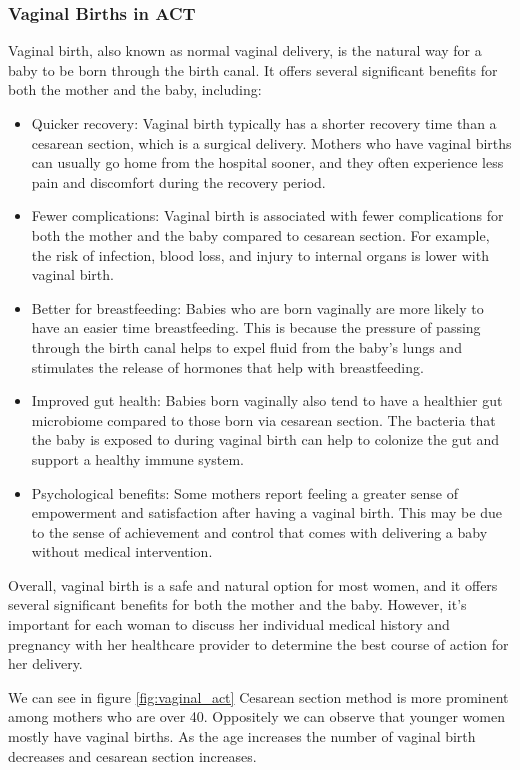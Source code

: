 \subsubsection{Vaginal Births in ACT}
Vaginal birth, also known as normal vaginal delivery, is the natural way for a baby to be born through the birth canal. It offers several significant benefits for both the mother and the baby, including:

\begin{itemize}
  \item Quicker recovery: Vaginal birth typically has a shorter recovery time than a cesarean section, which is a surgical delivery. Mothers who have vaginal births can usually go home from the hospital sooner, and they often experience less pain and discomfort during the recovery period.
  \item Fewer complications: Vaginal birth is associated with fewer complications for both the mother and the baby compared to cesarean section. For example, the risk of infection, blood loss, and injury to internal organs is lower with vaginal birth.
  \item Better for breastfeeding: Babies who are born vaginally are more likely to have an easier time breastfeeding. This is because the pressure of passing through the birth canal helps to expel fluid from the baby's lungs and stimulates the release of hormones that help with breastfeeding.
  \item Improved gut health: Babies born vaginally also tend to have a healthier gut microbiome compared to those born via cesarean section. The bacteria that the baby is exposed to during vaginal birth can help to colonize the gut and support a healthy immune system.
  \item Psychological benefits: Some mothers report feeling a greater sense of empowerment and satisfaction after having a vaginal birth. This may be due to the sense of achievement and control that comes with delivering a baby without medical intervention.
\end{itemize}

Overall, vaginal birth is a safe and natural option for most women, and it offers several significant benefits for both the mother and the baby. However, it's important for each woman to discuss her individual medical history and pregnancy with her healthcare provider to determine the best course of action for her delivery.

We can see in figure \ref{fig:vaginal_act} Cesarean section method is more prominent among mothers who are over 40. Oppositely we can observe that younger women mostly have vaginal births. As the age increases the number of vaginal birth decreases and cesarean section increases.

